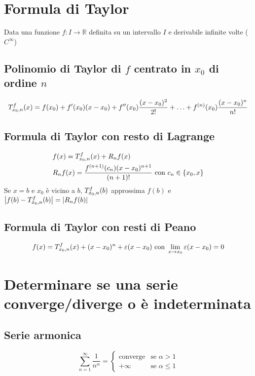 \documentclass[12pt, a4paper]{article}
\begin{document}
\section{Formula di Taylor}
    Data una funzione $f:I\rightarrow\mathbb{R}$ definita su un intervallo $I$ e derivabile infinite volte ($C^{\infty}$)
    \subsection{Polinomio di Taylor di $f$ centrato in $x_0$ di ordine $n$}
        \begin{equation*}
            \taylor{f}{x_0}{n}(x) = f(x_0)+f'(x_0)(x-x_0)+f''(x_0)\frac{(x-x_0)^2}{2!}+\ldots+f^{(n)}(x_0)\frac{(x-x_0)^n}{n!}
        \end{equation*}
    \subsection{Formula di Taylor con resto di Lagrange}
        \begin{equation*}
            \begin{split}
                &f(x) = \taylor{f}{x_0}{n}(x) + R_nf(x)\\
                &R_nf(x) = \frac{f^{(n+1)}(c_n)(x-x_0)^{n+1}}{(n+1)!} \text{ con } c_n\in\{x_0,x\}
            \end{split}
        \end{equation*}
        Se $x=b$ e $x_0$ è vicino a $b$, $\taylor{f}{x_0}{n}(b)$ approssima $f(b)$ e $\left|f(b)-\taylor{f}{x_0}{n}(b)\right| = \left|R_nf(b)\right|$
    \subsection{Formula di Taylor con resti di Peano}
        \begin{equation*}
                f(x)= \taylor{f}{x_0}{n}(x) + (x-x_0)^n + \varepsilon(x-x_0) \text{ con } \lim_{x\rightarrow x_0} \varepsilon(x-x_0) = 0
        \end{equation*}
\section{Determinare se una serie converge/diverge o è indeterminata}
    \subsection{Serie armonica}
        \begin{equation*}
            \sum_{n=1}^{\infty}\frac{1}{n^\alpha} = \begin{cases}
                \text{converge} & \text{se }\alpha > 1\\
                +\infty & \text{se }\alpha\leq 1
            \end{cases}
        \end{equation*}
\end{document}
